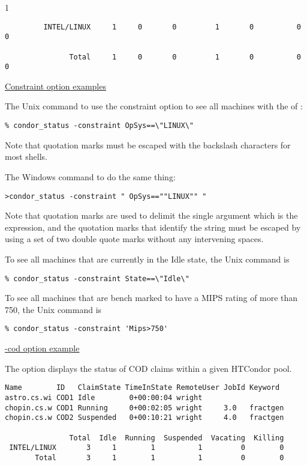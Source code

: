 \begin{ManPage}{\label{man-condor-status}}{1}
\begin{verbatim}
         INTEL/LINUX     1     0       0         1       0          0        0

               Total     1     0       0         1       0          0        0
\end{verbatim}
\normalsize

\underline{Constraint option examples}

The Unix command
to use the constraint option to see all machines with the 
of :
\begin{verbatim}
% condor_status -constraint OpSys==\"LINUX\"
\end{verbatim}
Note that quotation marks must be escaped with the backslash characters
for most shells.

The Windows command to do the same thing:
\begin{verbatim}
>condor_status -constraint " OpSys==""LINUX"" "
\end{verbatim}
Note that quotation marks are used to delimit the single argument which
is the expression, and the quotation marks that identify the string
must be escaped by using a set of two double quote marks without
any intervening spaces.

To see all machines that are currently in the Idle state,
the Unix command is
\begin{verbatim}
% condor_status -constraint State==\"Idle\"
\end{verbatim}

To see all machines that are bench marked to have a MIPS rating
of more than 750, the Unix command is
\begin{verbatim}
% condor_status -constraint 'Mips>750' 
\end{verbatim}

\underline{-cod option example}

The  option displays the status of COD
claims within a given HTCondor pool. 

\footnotesize
\begin{verbatim}
Name        ID   ClaimState TimeInState RemoteUser JobId Keyword
astro.cs.wi COD1 Idle        0+00:00:04 wright
chopin.cs.w COD1 Running     0+00:02:05 wright     3.0   fractgen
chopin.cs.w COD2 Suspended   0+00:10:21 wright     4.0   fractgen

               Total  Idle  Running  Suspended  Vacating  Killing
 INTEL/LINUX       3     1        1          1         0        0
       Total       3     1        1          1         0        0
\end{verbatim}
\normalsize


\end{ManPage}
